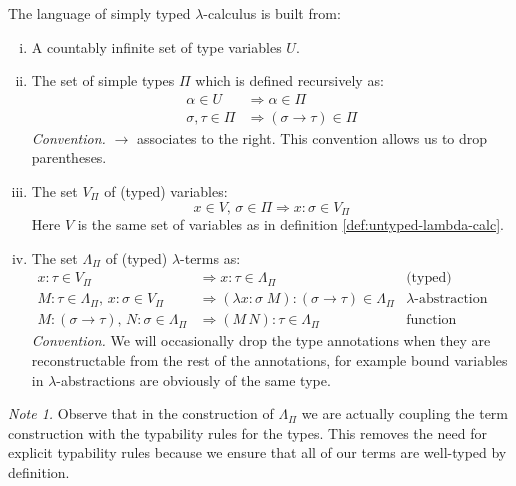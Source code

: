 \begin{definition}
\label{def:stlambda}
The language of simply typed $\lambda$-calculus is built from:
    \begin{enumerate}[(i)]
        \item A countably infinite set of type variables $U$.
        \item The set of simple types $\Pi$ which is defined recursively as:
        \begin{align*}
            \alpha \in U &\Rightarrow \alpha \in \Pi \\
            \sigma, \tau \in \Pi &\Rightarrow (\sigma \to \tau) \in \Pi
        \end{align*}
            \emph{Convention.} $\to$ associates to the right. This convention
            allows us to drop parentheses.
        \item The set $V_\Pi$ of (typed) variables:
            \[ x \in V,\, \sigma \in \Pi \Rightarrow x\!:\!\sigma \in V_\Pi \]
                Here $V$ is the same set of variables as in definition
                \ref{def:untyped-lambda-calc}.
        \item The set $\Lambda_\Pi$ of (typed) $\lambda$-terms as:
                \begin{align*}
                    x\!:\!\tau \in V_\Pi
                        &\Rightarrow x\!:\!\tau \in \Lambda_\Pi &
                            \text{(typed) variables} \\
                    M\!:\!\tau \in \Lambda_\Pi,\, x\!:\!\sigma \in V_\Pi
                        &\Rightarrow (\lambda x\!:\!\sigma\; M)\!:\!(\sigma \to
                        \tau) \in \Lambda_\Pi &
                            \text{$\lambda$-abstraction} \\
                    M\!:\!(\sigma \to \tau),\, N\!:\!\sigma \in \Lambda_\Pi
                        &\Rightarrow (M\, N)\!:\!\tau \in \Lambda_\Pi &
                            \text{function application}
                \end{align*}
            \emph{Convention.} We will occasionally drop the type annotations
            when they are reconstructable from the rest of the annotations, for
            example bound variables in $\lambda$-abstractions are obviously of
            the same type.

        \end{enumerate}
\end{definition}
\emph{Note 1.}
    Observe that in the construction of $\Lambda_\Pi$ we are actually coupling the
    term construction with the typability rules for the types. This removes the
    need for explicit typability rules because we ensure that all of our terms
    are well-typed by definition.

